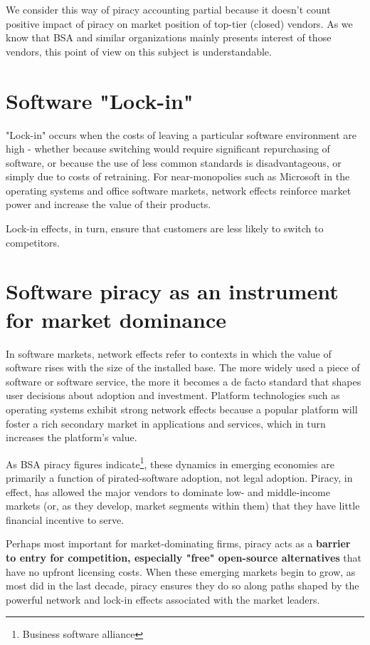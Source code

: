 \documentclass[times, utf8, seminar]{fit}
\begin{document}
We consider this way of piracy accounting partial because it doesn't count positive impact of piracy on market position of top-tier (closed) vendors. As we know that BSA and similar organizations mainly presents interest of those vendors, this point of view on this subject is understandable.  

\section{Software "Lock-in"}

"Lock-in" occurs when the costs of leaving a particular software environment are high - whether because switching would require significant repurchasing of software, or because the use of less common standards is disadvantageous, or simply due to costs of retraining. For near-monopolies such as Microsoft in the operating systems and office software markets, network effects reinforce market power and increase the value of their products.

Lock-in effects, in turn, ensure that customers are less likely to switch to competitors.

\section{Software piracy as an instrument for market dominance}  

In software markets, network effects refer to contexts in which the value of software rises with the size of the installed base. The more widely used a piece of software or software service, the more it becomes a de facto standard that shapes user decisions about adoption and investment. Platform technologies such as operating systems exhibit strong network effects because a popular platform will foster a rich secondary market in applications and services, which in turn increases the platform’s value. 

As BSA piracy figures indicate\footnote{Business software alliance}, these dynamics in emerging economies are primarily a function of pirated-software adoption, not legal adoption. Piracy, in effect, has allowed the major vendors to dominate low- and middle-income markets (or, as they develop, market segments within them) that they have little financial incentive to serve. 

Perhaps most important for market-dominating firms, piracy acts as a \textbf{barrier to entry for competition, especially "free" open-source alternatives} that have no upfront licensing costs. When these emerging markets begin to grow, as most did in the last decade, piracy ensures they do so along paths shaped by the powerful network and lock-in effects associated with the market leaders.
\end{document}
